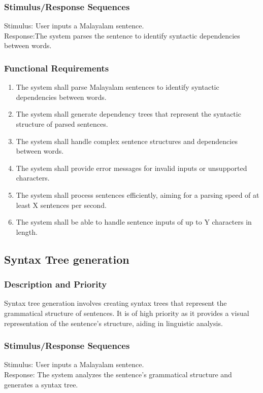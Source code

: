 \documentclass[12pt]{article}
\begin{document}
	\subsubsection{Stimulus/Response Sequences}
	Stimulus: User inputs a Malayalam sentence.\\
	Response:The system parses the sentence to identify syntactic dependencies between
	words.
	
	\subsubsection{Functional Requirements}
	\begin{enumerate}
		\item The system shall parse Malayalam sentences to identify syntactic dependencies
		between words.
		\item The system shall generate dependency trees that represent the syntactic structure
		of parsed sentences.
		\item The system shall handle complex sentence structures and dependencies between
		words.
		\item The system shall provide error messages for invalid inputs or unsupported
		characters.
		\item The system shall process sentences efficiently, aiming for a parsing speed of at
		least X sentences per second.
		\item The system shall be able to handle sentence inputs of up to Y characters in length.
	\end{enumerate}

	\subsection{Syntax Tree generation}
	
	\subsubsection{Description and Priority}
	Syntax tree generation involves creating syntax trees that represent the grammatical
	structure of sentences. It is of high priority as it provides a visual representation of the
	sentence's structure, aiding in linguistic analysis.
	
	\subsubsection{Stimulus/Response Sequences}
	Stimulus: User inputs a Malayalam sentence.\\
	Response: The system analyzes the sentence's grammatical structure and generates a
	syntax tree.
	
\end{document}
